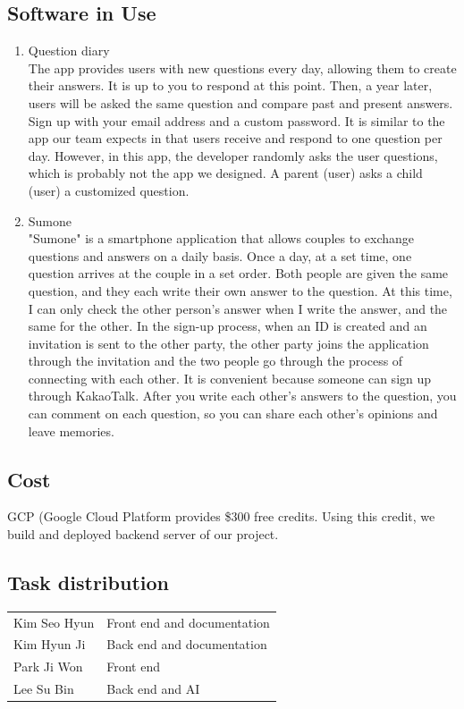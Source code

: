 \documentclass[conference]{IEEEtran}
\begin{document}
\subsection{Software in Use}
    \begin{enumerate}
        \item Question diary\\
        The app provides users with new questions every day, allowing them to create their answers. It is up to you to respond at this point. Then, a year later, users will be asked the same question and compare past and present answers. Sign up with your email address and a custom password. It is similar to the app our team expects in that users receive and respond to one question per day. However, in this app, the developer randomly asks the user questions, which is probably not the app we designed. A parent (user) asks a child (user) a customized question.\\
        \item Sumone\\
        "Sumone" is a smartphone application that allows couples to exchange questions and answers on a daily basis. Once a day, at a set time, one question arrives at the couple in a set order. Both people are given the same question, and they each write their own answer to the question. At this time, I can only check the other person's answer when I write the answer, and the same for the other. In the sign-up process, when an ID is created and an invitation is sent to the other party, the other party joins the application through the invitation and the two people go through the process of connecting with each other. It is convenient because someone can sign up through KakaoTalk. After you write each other's answers to the question, you can comment on each question, so you can share each other's opinions and leave memories.\\
    \end{enumerate}
    
\subsection{Cost}
GCP (Google Cloud Platform provides \$300 free credits. Using this credit, we build and deployed backend server of our project.
\vspace{0.5cm}
\subsection{Task distribution}
\begin{table}[H]
    \centering
    \begin{tabular}{m{3cm}|m{4cm}}
    \toprule
    Kim Seo Hyun & Front end and documentation \\
    Kim Hyun Ji & Back end and documentation\\
    Park Ji Won & Front end\\
    Lee Su Bin & Back end and AI\\
    \bottomrule
    \end{tabular}
    \end{table}
\end{document}

